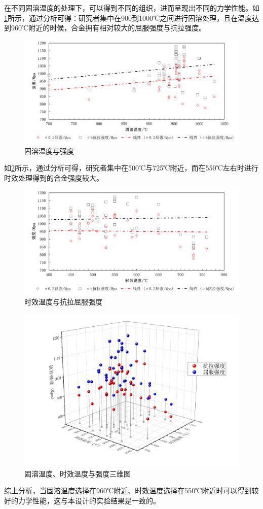 在不同固溶温度的处理下，可以得到不同的组织，进而呈现出不同的力学性能。如\ref{fig:固溶温度与强度}所示，通过分析可得：研究者集中在900到1000℃之间进行固溶处理，且在温度达到960℃附近的时候，合金拥有相对较大的屈服强度与抗拉强度。
\begin{figure}[h!]
	\centering
	\includegraphics[width=0.7\linewidth]{TC4钛合金热处理研究进展/固溶温度与强度}
	\caption{固溶温度与强度}
	\label{fig:固溶温度与强度}
\end{figure}

如\ref{fig:时效温度与抗拉屈服强度}所示，通过分析可得，研究者集中在500℃与725℃附近，而在550℃左右时进行时效处理得到的合金强度较大。
\begin{figure}[h!]
	\centering
	\includegraphics[width=0.7\linewidth]{TC4钛合金热处理研究进展/时效温度与强度}
	\caption{时效温度与抗拉屈服强度}
	\label{fig:时效温度与抗拉屈服强度}
\end{figure}

\begin{figure}[h!]
	\centering
	\includegraphics[width=0.7\linewidth]{TC4钛合金热处理研究进展/固溶温度、时效温度与强度}
	\caption{固溶温度、时效温度与强度三维图}
	\label{fig:}
\end{figure}
综上分析，当固溶温度选择在960℃附近、时效温度选择在550℃附近时可以得到较好的力学性能，这与本设计的实验结果是一致的。

